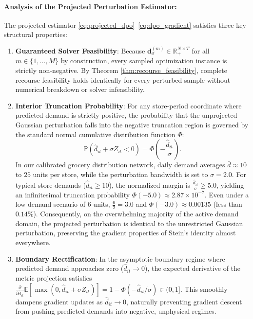 \documentclass[11pt,a4paper]{article}
\theoremstyle{definition}
\theoremstyle{remark}
\begin{document}
\paragraph{Analysis of the Projected Perturbation Estimator:}
The projected estimator \eqref{eq:projected_dpo}--\eqref{eq:dpo_gradient} satisfies three key structural properties:
\begin{enumerate}[label=(\roman*)]
    \item \textbf{Guaranteed Solver Feasibility}: Because $\mathbf{d}_\sigma^{(m)} \in \mathbb{R}_+^{N \times T}$ for all $m \in \{1, \dots, M\}$ by construction, every sampled optimization instance is strictly non-negative. By Theorem \ref{thm:recourse_feasibility}, complete recourse feasibility holds identically for every perturbed sample without numerical breakdown or solver infeasibility.
    \item \textbf{Interior Truncation Probability}: For any store-period coordinate where predicted demand is strictly positive, the probability that the unprojected Gaussian perturbation falls into the negative truncation region is governed by the standard normal cumulative distribution function $\Phi$:
    \begin{equation*}
        \mathbb{P}(\hat{d}_{it} + \sigma Z_{it} < 0) = \Phi\left( -\frac{\hat{d}_{it}}{\sigma} \right).
    \end{equation*}
    In our calibrated grocery distribution network, daily demand averages $\bar{d} \approx 10$ to $25$ units per store, while the perturbation bandwidth is set to $\sigma = 2.0$. For typical store demands ($\hat{d}_{it} \ge 10$), the normalized margin is $\frac{\hat{d}_{it}}{\sigma} \ge 5.0$, yielding an infinitesimal truncation probability $\Phi(-5.0) \approx 2.87 \times 10^{-7}$. Even under a low demand scenario of $6$ units, $\frac{6}{2} = 3.0$ and $\Phi(-3.0) \approx 0.00135$ (less than $0.14\%$). Consequently, on the overwhelming majority of the active demand domain, the projected perturbation is identical to the unrestricted Gaussian perturbation, preserving the gradient properties of Stein's identity \citep{berthet2020learning} almost everywhere.
    \item \textbf{Boundary Rectification}: In the asymptotic boundary regime where predicted demand approaches zero ($\hat{d}_{it} \to 0$), the expected derivative of the metric projection satisfies $\frac{\partial}{\partial \hat{d}_{it}} \mathbb{E}[\max(0, \hat{d}_{it} + \sigma Z_{it})] = 1 - \Phi(-\hat{d}_{it}/\sigma) \in (0, 1]$. This smoothly dampens gradient updates as $\hat{d}_{it} \to 0$, naturally preventing gradient descent from pushing predicted demands into negative, unphysical regimes.
\end{enumerate}
\end{document}
